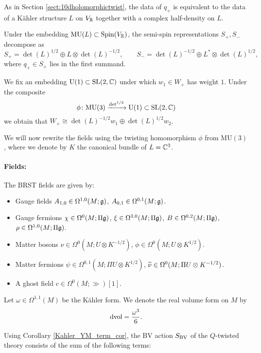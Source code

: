 \documentclass[10pt, oneside]{article}
\newcommand{\MU}{\mathrm{MU}}
\renewcommand{\U}{\mathrm{U}}
\begin{document}
As in Section \ref{sect:10dholomorphictwist}, the data of $q_+$ is equivalent to the data of a K\"ahler structure $L$ on $V_\mathbb R$ together with a complex half-density on $L$.

Under the embedding $\MU(L)\subset \Spin(V_\RR)$, the semi-spin representations $S_+, S_-$ decompose as
\[S_+ = \det(L)^{1/2}\oplus L\otimes \det(L)^{-1/2},\qquad S_- = \det(L)^{-1/2} \oplus L^*\otimes \det(L)^{1/2},\]
where $q_+\in S_+$ lies in the first summand.

We fix an embedding $\U(1)\subset \SL(2, \CC)$ under which $w_1\in W_+$ has weight $1$. Under the composite
\[\phi\colon\MU(3)\xrightarrow{\det^{1/2}}\U(1)\subset \SL(2, \CC)\]
we obtain that $W_+\cong \det(L)^{-1/2} w_1\oplus \det(L)^{1/2} w_2$.

We will now rewrite the fields using the twisting homomorphism $\phi$ from $\MU(3)$, where we denote by $K$ the canonical bundle of $L=\mathbb C^3$.

\vspace{-10pt}
\paragraph{Fields:} The BRST fields are given by:
\begin{itemize}
\item Gauge fields $A_{1, 0} \in \Omega^{1, 0}(M; \mathfrak g)$, $A_{0, 1}\in\Omega^{0, 1}(M; \mathfrak g)$.
\item Gauge fermions $\chi\in\Omega^0(M; \Pi\mathfrak g)$, $\xi\in\Omega^{3, 0}(M; \Pi\mathfrak g)$, $B\in\Omega^{0, 2}(M; \Pi\mathfrak g)$, $\rho\in\Omega^{1, 0}(M; \Pi\mathfrak g)$.
\item Matter bosons $\nu\in\Omega^0(M; U\otimes K^{-1/2})$, $\phi\in\Omega^0(M; U\otimes K^{1/2})$.
\item Matter fermions $\psi\in \Omega^{0, 1}(M; \Pi U\otimes K^{1/2})$, $\widetilde{\nu}\in\Omega^0(M; \Pi U\otimes K^{-1/2})$.
\item A ghost field $c\in \Omega^0(M; \gg)[1]$.
\end{itemize}

Let $\omega\in\Omega^{1, 1}(M)$ be the K\"ahler form. We denote the real volume form on $M$ by
\[\operatorname{dvol} = \frac{\omega^3}{6}.\]

Using Corollary \ref{Kahler_YM_term_cor}, the BV action $S_{\mathrm{BV}}$ of the $Q$-twisted theory consists of the sum of the following terms:
\end{document}
